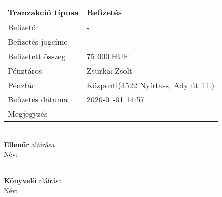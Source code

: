 \documentclass{article}
\begin{document}
\begin{minipage}[t]{0.45\textwidth}
  \renewcommand{\arraystretch}{1.5}
  \begin{tabular}{ |p{3cm}|p{4cm}| }
    \hline
    Tranzakció típusa & Befizetés                                         \\
    \hline
    Befizető          & -                                                 \\
    \hline
    Befizetés jogcíme & -                                                 \\
    \hline
    Befizetett összeg & 75 000 HUF                                        \\
    \hline
    Pénztáros         & Zsurkai Zsolt                                     \\
    \hline
    Pénztár           & Központi\footnotemark (4522 Nyírtass, Ady út 11.) \\
    \hline
    Befizetés dátuma  & 2020-01-01 14:57                                  \\
    \hline
    Megjegyzés        & -                                                 \\
    \hline
  \end{tabular}
\end{minipage}
\hfill
\begin{minipage}[t]{0.45\textwidth}
  \makebox[2.5in]{\hrulefill} \\
  {\bf Ellenőr} aláírása \\
  Név:

  \bigskip
  \makebox[2.5in]{\hrulefill} \\
  {\bf Könyvelő} aláírása\\
  Név:
\end{minipage}
\end{document}
